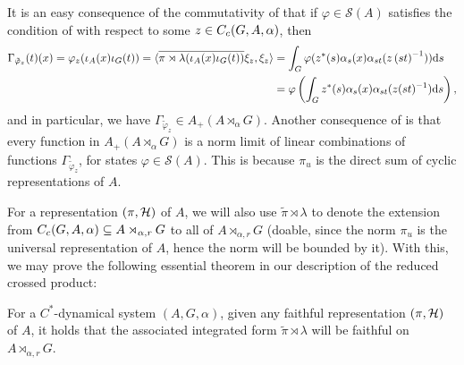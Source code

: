 \begin{remark}
	It is an easy consequence of the commutativity of  that if $\varphi \in \mathcal{S}(A)$ satisfies the condition of  with respect to some $z \in C_c(G,A,\alpha)$, then 
\begin{align*}
	\Gamma_{\tilde \varphi_z}(t)(x) = \varphi_z(\iota_A(x)  \iota_G(t)) = \langle \overline{\pi \rtimes \lambda(\iota_A(x) \iota_G(t))} \xi_z , \xi_z\rangle & = \int_G \varphi(z^*(s)\alpha_s(x)\alpha_{st}(z\left( st \right)^{-1})) \mathrm{d} s \\
	&= \varphi\left( \int_G z^*(s) \alpha_s(x) \alpha_{st}(z(st)^{-1})\mathrm{d} s \right),
\end{align*}
and in particular, we have $\Gamma_{\tilde \varphi_z} \in A_+(A \rtimes_\alpha G)$. Another consequence of  is that every function in $A_+(A \rtimes_\alpha G)$ is a norm limit of linear combinations of functions $\Gamma_{\tilde \varphi_z}$, for states $\varphi \in \mathcal{S}(A)$. This is because $\pi_u$ is the direct sum of cyclic representations of $A$.
\end{remark}
For a representation $(\pi,\mathcal{H})$ of $A$, we will also use $\tilde \pi \rtimes \lambda$ to denote the extension from $C_c(G,A,\alpha)\subseteq A \rtimes_{\alpha,r}G$ to all of $A \rtimes_{\alpha, r} G$ (doable, since the norm $\pi_u$ is the universal representation of $A$, hence the norm will be bounded by it). With this, we may prove the following essential theorem in our description of the reduced crossed product: 
\begin{theorem}
	For a $C^*$-dynamical system $(A,G,\alpha)$, given any faithful representation $(\pi,\mathcal{H})$ of $A$, it holds that the associated integrated form $\tilde \pi \rtimes \lambda$ will be faithful on $A \rtimes_{\alpha, r} G$.
	\label{mult:reducedfaithful}
\end{theorem}
